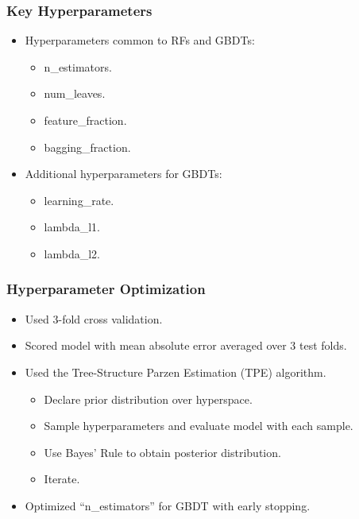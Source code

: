 \documentclass{beamer}
\begin{document}
\begin{frame}
\frametitle{Key Hyperparameters}
\begin{itemize}
\item Hyperparameters common to RFs and GBDTs:
\begin{itemize}
\item n\_estimators.
\item num\_leaves.
\item feature\_fraction.
\item bagging\_fraction.
\end{itemize}
\item Additional hyperparameters for GBDTs:
\begin{itemize}
\item learning\_rate.
\item lambda\_l1.
\item lambda\_l2.
\end{itemize}
\end{itemize}
\end{frame}

\begin{frame}
\frametitle{Hyperparameter Optimization}
\begin{itemize}
\item Used 3-fold cross validation.
\item Scored model with mean absolute error averaged over 3 test folds.
\item Used the Tree-Structure Parzen Estimation (TPE) algorithm.
\begin{itemize}
\item Declare prior distribution over hyperspace.
\item Sample hyperparameters and evaluate model with each sample.
\item Use Bayes' Rule to obtain posterior distribution.
\item Iterate.
\end{itemize}
\item Optimized ``n\_estimators'' for GBDT with early stopping.
\end{itemize}
\end{frame}
\end{document}
